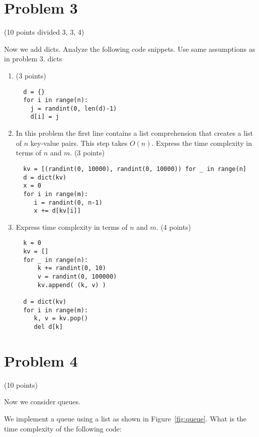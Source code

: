 \documentclass{article}
\begin{document}
\section{Problem 3} (10 points divided 3, 3, 4)

Now we add dicts.  Analyze the following code snippets. Use same
assumptions as in problem 3.  dicts

\begin{enumerate}[label=(\alph*)]

\item (3 points)
  
\begin{verbatim}
  d = {}
  for i in range(n):
    j = randint(0, len(d)-1)
    d[i] = j
\end{verbatim}

\item In this problem the first line contains a list comprehension that
  creates a list of $n$ key-value pairs.  This step takes $O(n)$.  Express
  the time complexity in terms of $n$ and $m$. (3 points)
  
\begin{verbatim}
  kv = [(randint(0, 10000), randint(0, 10000)) for _ in range(n]
  d = dict(kv)
  x = 0
  for i in range(m):
     i = randint(0, n-1)
     x += d[kv[i]]
\end{verbatim}

\item Express time complexity in terms of $n$ and $m$. (4 points)
  
\begin{verbatim}
  k = 0
  kv = []
  for _ in range(n):
      k += randint(0, 10)
      v = randint(0, 100000)
      kv.append( (k, v) )

  d = dict(kv)
  for i in range(m):
     k, v = kv.pop()
     del d[k]
\end{verbatim}
\end{enumerate}

\section{Problem 4} (10 points)

Now we consider queues.

We implement a queue using a list as shown in Figure~\ref{fig:queue}.
What is the time complexity of the following code:
\end{document}
